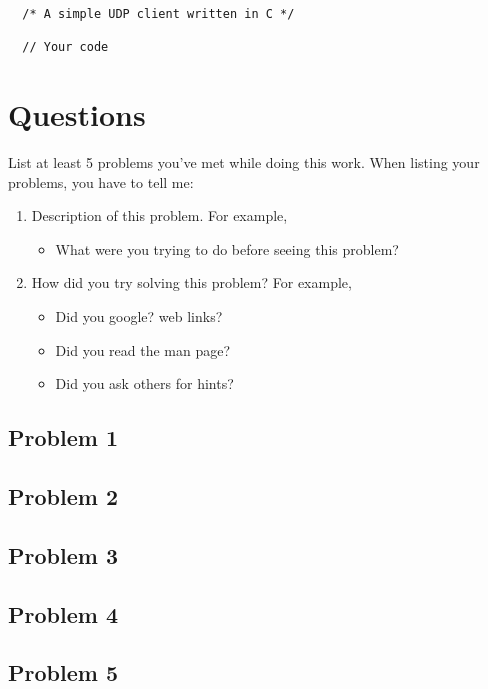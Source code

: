 \documentclass{swfulabreport}
\begin{document}
\begin{verbatim}
  /* A simple UDP client written in C */

  // Your code
\end{verbatim}

\hypertarget{questions}{%
\section{Questions}\label{questions}}

List at least 5 problems you've met while doing this work. When listing
your problems, you have to tell me:

\begin{enumerate}
\def\labelenumi{\arabic{enumi}.}
\item
  Description of this problem. For example,

  \begin{itemize}
  \tightlist
  \item
    What were you trying to do before seeing this problem?
  \end{itemize}
\item
  How did you try solving this problem? For example,

  \begin{itemize}
  \tightlist
  \item
    Did you google? web links?
  \item
    Did you read the man page?
  \item
    Did you ask others for hints?
  \end{itemize}
\end{enumerate}

\hypertarget{problem-1}{%
\subsection{Problem 1}\label{problem-1}}

\hypertarget{problem-2}{%
\subsection{Problem 2}\label{problem-2}}

\hypertarget{problem-3}{%
\subsection{Problem 3}\label{problem-3}}

\hypertarget{problem-4}{%
\subsection{Problem 4}\label{problem-4}}

\hypertarget{problem-5}{%
\subsection{Problem 5}\label{problem-5}}
\end{document}
